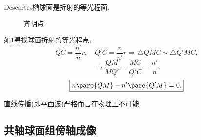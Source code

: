 \documentclass{ctexart}
\begin{document}
\begin{remark}
    Descartes椭球面是折射的等光程面.
\end{remark}
\begin{figure}[ht]
    \centering
    \caption{齐明点}
    \label{fig:齐明点}
\end{figure}
\begin{sample}
    \begin{ex}[齐明点]\label{ex:齐明点}如\cref{fig:齐明点}寻找球面折射的等光程点,
        \[ QC = \frac{n'}{n}r,\quad Q'C = \frac{n}{n'}r \Rightarrow \bigtriangleup QMC \sim \bigtriangleup Q'MC, \]
        \[ \Rightarrow \frac{QM}{MQ'} = \frac{MC}{Q'C} = \frac{n'}{n}. \]
        \[ \boxed{n\pare{QM} - n'\pare{Q'M} = 0.} \]
    \end{ex}
\end{sample}
\begin{remark}
    直线传播(即平面波)严格而言在物理上不可能.
\end{remark}


\subsection{共轴球面组傍轴成像} %
\label{sub:共轴球面组傍轴成像}
\end{document}
